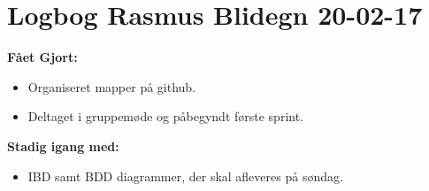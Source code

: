 \documentclass[12pt]{article}
\begin{document}
\section*{Logbog Rasmus Blidegn 20-02-17}
\textbf{Fået Gjort:}
\begin{itemize}
\item Organiseret mapper på github.
\item Deltaget i gruppemøde og påbegyndt første sprint. 
\end{itemize}
\textbf{Stadig igang med:}
\begin{itemize}
\item IBD samt BDD diagrammer, der skal afleveres på søndag. 
\end{itemize}
\end{document}
